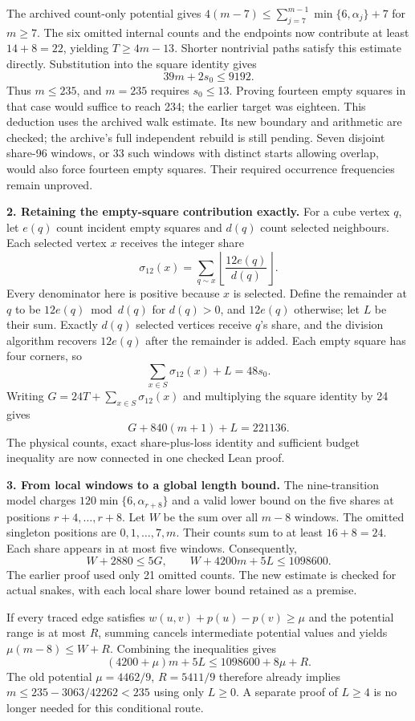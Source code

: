 \documentclass[11pt,a4paper]{article}
\begin{document}
The archived count-only potential gives
$4(m-7)\le\sum_{j=7}^{m-1}\min\{6,\alpha_j\}+7$ for $m\ge7$.
The six omitted internal counts and the endpoints now contribute at
least $14+8=22$, yielding $T\ge4m-13$. Shorter nontrivial paths satisfy
this estimate directly. Substitution into the square identity gives
\[
\boxed{39m+2s_0\le9192.}
\]
Thus $m\le235$, and $m=235$ requires $s_0\le13$. Proving fourteen empty
squares in that case would suffice to reach 234; the earlier target was
eighteen. This deduction uses the archived walk estimate. Its new boundary
and arithmetic are checked; the archive's full independent rebuild is
still pending. Seven disjoint share-96 windows, or 33 such windows with
distinct starts allowing overlap, would also force fourteen empty squares.
Their required occurrence frequencies remain unproved.

\textbf{2. Retaining the empty-square contribution exactly.}
For a cube vertex $q$, let $e(q)$ count incident empty squares and $d(q)$
count selected neighbours. Each selected vertex $x$ receives the integer share
\[
\sigma_{12}(x)=\sum_{q\sim x}\left\lfloor\frac{12e(q)}{d(q)}\right\rfloor.
\]
Every denominator here is positive because $x$ is selected. Define the
remainder at $q$ to be $12e(q)\bmod d(q)$ for $d(q)>0$, and $12e(q)$
otherwise; let $L$ be their sum. Exactly $d(q)$ selected vertices receive
$q$'s share, and the division algorithm recovers $12e(q)$ after the
remainder is added. Each empty square has four corners, so
\[
\sum_{x\in S}\sigma_{12}(x)+L=48s_0.
\]
Writing $G=24T+\sum_{x\in S}\sigma_{12}(x)$ and multiplying the square
identity by 24 gives
\[
\boxed{G+840(m+1)+L=221136.}
\]
The physical counts, exact share-plus-loss identity and sufficient budget
inequality are now connected in one checked Lean proof.

\textbf{3. From local windows to a global length bound.}
The nine-transition model charges $120\min\{6,\alpha_{r+8}\}$ and a
valid lower bound on the five shares at positions $r+4,\ldots,r+8$.
Let $W$ be the sum over all $m-8$ windows. The omitted singleton positions
are $0,1,\ldots,7,m$. Their counts sum to at least $16+8=24$.
Each share appears in at most five windows. Consequently,
\[
W+2880\le5G,\qquad W+4200m+5L\le1098600.
\]
The earlier proof used only 21 omitted counts. The new estimate is checked
for actual snakes, with each local share lower bound retained as a premise.

If every traced edge satisfies
$w(u,v)+p(u)-p(v)\ge\mu$ and the potential range is at most $R$,
summing cancels intermediate potential values and yields
$\mu(m-8)\le W+R$. Combining the inequalities gives
\[
\boxed{(4200+\mu)m+5L\le1098600+8\mu+R.}
\]
The old potential $\mu=4462/9$, $R=5411/9$ therefore already implies
$m\le235-3063/42262<235$ using only $L\ge0$.
A separate proof of $L\ge4$ is no longer needed for this conditional route.
\end{document}
